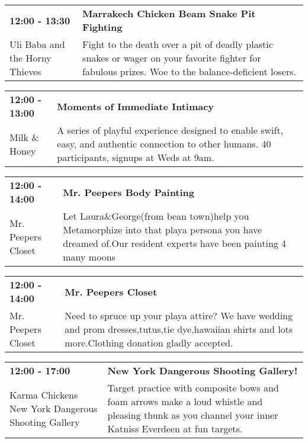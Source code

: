 \begin{tabular}{ p{1in} p{2.2in} }
    \textbf{12:00 - 13:30} & \textbf{Marrakech Chicken Beam Snake Pit Fighting} \\
    Uli Baba and the Horny Thieves \newline  & Fight to the death over a pit of deadly plastic snakes or wager on
your favorite fighter for fabulous prizes. Woe to the
balance-deficient losers. \\
    \hline 
\end{tabular}
    
\begin{tabular}{ p{1in} p{2.2in} }
    \textbf{12:00 - 13:00} & \textbf{Moments of Immediate Intimacy} \\
    Milk \& Honey \newline  & A series of playful experience designed to enable swift, easy, and authentic connection to other humans. 40 participants, signups at Weds at 9am. \\
    \hline 
\end{tabular}
    
\begin{tabular}{ p{1in} p{2.2in} }
    \textbf{12:00 - 14:00} & \textbf{Mr. Peepers Body Painting } \\
    Mr. Peepers Closet \newline  & Let Laura\&George(from bean town)help you Metamorphize into that playa persona you have dreamed of.Our resident experts have been painting 4 many moons \\
    \hline 
\end{tabular}
    
\begin{tabular}{ p{1in} p{2.2in} }
    \textbf{12:00 - 14:00} & \textbf{Mr. Peepers Closet} \\
    Mr. Peepers Closet \newline  & Need to spruce up your playa attire? We have wedding and prom dresses,tutus,tie dye,hawaiian shirts and lots more.Clothing donation gladly accepted. \\
    \hline 
\end{tabular}
    
\begin{tabular}{ p{1in} p{2.2in} }
    \textbf{12:00 - 17:00} & \textbf{New York Dangerous Shooting Gallery!} \\
    Karma Chickens \newline New York Dangerous Shooting Gallery & Target practice with composite bows and foam arrows make a loud whistle and pleasing thunk as you channel your inner Katniss Everdeen at fun targets. \\
    \hline 
\end{tabular}
    
